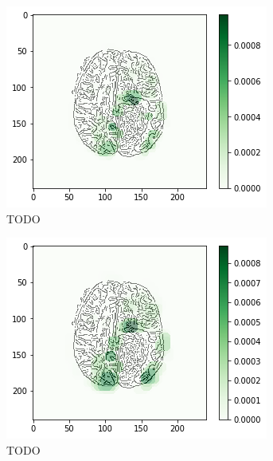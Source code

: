 \begin{figure}[H]
    \centering
    \begin{subfigure}{.33\textwidth}
        \centering
        \includegraphics[width=\linewidth]{chapters/06_hdm/b_Brats18_TCIA08_242_1_L2/34.png}
        \caption{TODO}
    \end{subfigure}%
    \begin{subfigure}{.33\textwidth}
        \centering
        \includegraphics[width=\linewidth]{chapters/06_hdm/circle15/14.png}
        \caption{TODO}
    \end{subfigure}
        \begin{subfigure}{.33\textwidth}
        \centering

\end{subfigure}
\end{figure}
